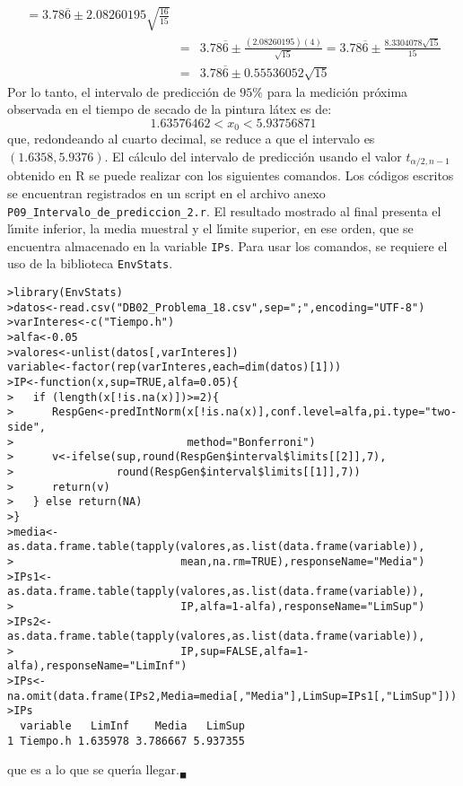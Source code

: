 \begin{solucion}
\begin{eqnarray*}
  = 3.78\overline{6} \pm 2.08260195 \sqrt{\frac{16}{15}} \\
  & = & 3.78\overline{6} \pm \frac{(2.08260195)(4)}{\sqrt{15}} = 3.78\overline{6} \pm \frac{8.3304078\sqrt{15}}{15} \\
  & = & 3.78\overline{6} \pm 0.55536052\sqrt{15}
 \end{eqnarray*}
 Por lo tanto, el intervalo de predicci\'on de $95\%$ para la medici\'on pr\'oxima observada en el tiempo de secado de la pintura l\'atex es de:
 \begin{equation*}
  1.63576462 < x_0 < 5.93756871
 \end{equation*}
 que, redondeando al cuarto decimal, se reduce a que el intervalo es $(1.6358, 5.9376)$. El c\'alculo del intervalo de predicci\'on usando el valor $t_{\alpha/2,n-1}$ obtenido en R se puede realizar con los siguientes comandos. Los c\'odigos escritos se encuentran registrados en un script en el archivo anexo \texttt{P09\_Intervalo\_de\_prediccion\_2.r}. El resultado mostrado al final presenta el l\'{\i}mite inferior, la media muestral y el l\'{\i}mite superior, en ese orden, que se encuentra almacenado en la variable \texttt{IPs}. Para usar los comandos, se requiere el uso de la biblioteca \texttt{EnvStats}.
 \begin{verbatim}
>library(EnvStats)
>datos<-read.csv("DB02_Problema_18.csv",sep=";",encoding="UTF-8")
>varInteres<-c("Tiempo.h")
>alfa<-0.05
>valores<-unlist(datos[,varInteres])
variable<-factor(rep(varInteres,each=dim(datos)[1]))
>IP<-function(x,sup=TRUE,alfa=0.05){
>   if (length(x[!is.na(x)])>=2){
>      RespGen<-predIntNorm(x[!is.na(x)],conf.level=alfa,pi.type="two-side",
>                           method="Bonferroni")
>      v<-ifelse(sup,round(RespGen$interval$limits[[2]],7),
>                round(RespGen$interval$limits[[1]],7))
>      return(v)
>   } else return(NA)
>}
>media<-as.data.frame.table(tapply(valores,as.list(data.frame(variable)),
>                          mean,na.rm=TRUE),responseName="Media")
>IPs1<-as.data.frame.table(tapply(valores,as.list(data.frame(variable)),
>                          IP,alfa=1-alfa),responseName="LimSup")
>IPs2<-as.data.frame.table(tapply(valores,as.list(data.frame(variable)),
>                          IP,sup=FALSE,alfa=1-alfa),responseName="LimInf")
>IPs<-na.omit(data.frame(IPs2,Media=media[,"Media"],LimSup=IPs1[,"LimSup"]))
>IPs
  variable   LimInf    Media   LimSup
1 Tiempo.h 1.635978 3.786667 5.937355
 \end{verbatim}
 \vspace{-0.5cm}
 que es a lo que se quer\'{\i}a llegar.${}_{\blacksquare}$
\end{solucion}
